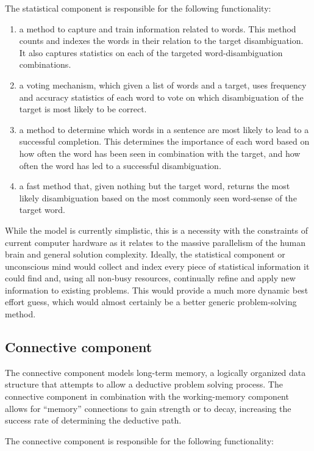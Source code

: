 The statistical component is responsible for the following functionality:

\begin{enumerate}     
	\item a method to capture and train information related to words.  
	This method counts and indexes the words in their relation to the 
	target disambiguation. It also captures statistics on each of the 
	targeted word-disambiguation combinations.     
	\item a voting mechanism, which given a list of words and a target, uses 
	frequency and accuracy statistics of each word to vote on which disambiguation 
	of the target is most likely to be correct.
	\item a method to determine which words in a sentence are most likely to 
	lead to a successful completion.  This determines the importance of each 
	word based on how often the word has been seen in combination with the target,
	and how often the word has led to a successful disambiguation.     
	\item a fast method that, given nothing but the target word, returns the most 
	likely disambiguation based on the most commonly seen word-sense of the target word.
\end{enumerate}

While the model is currently simplistic, this is a necessity with the constraints of current computer
hardware as it relates to the massive parallelism of the human brain and general
solution complexity.  Ideally, the statistical component or unconscious mind
would collect and index every piece of statistical information it could find 
and, using all non-busy resources, continually refine and apply new information
to existing problems.  This would provide a much more dynamic best effort guess, which would almost
certainly be a better generic problem-solving method.

\subsection{Connective component} 

The connective component models long-term
memory, a logically organized data structure that attempts to allow a deductive
problem solving process.  The connective component in combination with the
working-memory component allows for ``memory'' connections to gain strength or
to decay, increasing the success rate of determining the deductive path.

The connective component is responsible for the following functionality:

